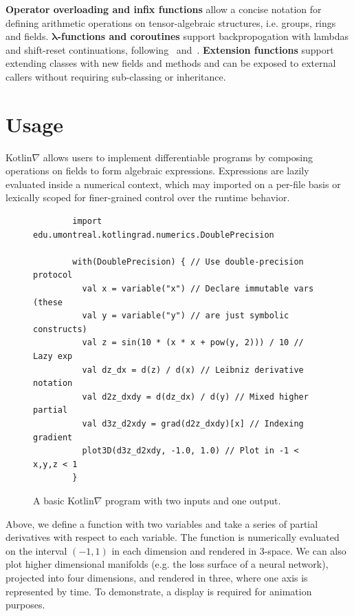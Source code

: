 \documentclass[12pt,initial,twoside,maitrise]{dms}
\numberwithin{equation}{section}
\numberwithin{table}{chapter}
\numberwithin{figure}{chapter}
\begin{document}
\textbf{Operator overloading and infix functions} allow a concise notation for defining arithmetic operations on tensor-algebraic structures, i.e. groups, rings and fields.
\textbf{$\mathbf{\lambda}$-functions and coroutines} support backpropogation with lambdas and shift-reset continuations, following~\cite{pearlmutter2008reverse} and~\cite{DBLP:journals-corr-abs-1803-10228}.
\textbf{Extension functions} support extending classes with new fields and methods and can be exposed to external callers without requiring sub-classing or inheritance.

\section{Usage}

Kotlin$\nabla$ allows users to implement differentiable programs by composing operations on fields to form algebraic expressions. Expressions are lazily evaluated inside a numerical context, which may imported on a per-file basis or lexically scoped for finer-grained control over the runtime behavior.

\begin{figure}[!htb]
    \begin{verbatim}
        import edu.umontreal.kotlingrad.numerics.DoublePrecision

        with(DoublePrecision) { // Use double-precision protocol
          val x = variable("x") // Declare immutable vars (these
          val y = variable("y") // are just symbolic constructs)
          val z = sin(10 * (x * x + pow(y, 2))) / 10 // Lazy exp
          val dz_dx = d(z) / d(x) // Leibniz derivative notation
          val d2z_dxdy = d(dz_dx) / d(y) // Mixed higher partial
          val d3z_d2xdy = grad(d2z_dxdy)[x] // Indexing gradient
          plot3D(d3z_d2xdy, -1.0, 1.0) // Plot in -1 < x,y,z < 1
        }
    \end{verbatim}

    \caption{A basic Kotlin$\nabla$ program with two inputs and one output.}
    \label{label:fig1}
\end{figure}

Above, we define a function with two variables and take a series of partial derivatives with respect to each variable. The function is numerically evaluated on the interval $(-1, 1)$ in each dimension and rendered in 3-space. We can also plot higher dimensional manifolds (e.g. the loss surface of a neural network), projected into four dimensions, and rendered in three, where one axis is represented by time. To demonstrate, a display is required for animation purposes.
\end{document}
